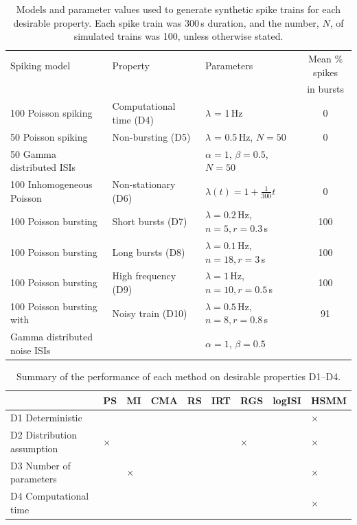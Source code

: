 \documentclass[12pt, titlepage]{article}
\begin{document}
			\begin{table}[h] \centering \small{
					\begin{tabular}{|l|l|l|c|}
						\hline
						Spiking model & Property & Parameters & Mean \% spikes 
						\\ & & & in bursts
						\\ \hline  \rowcolor{Gray} 100 Poisson spiking &  Computational time (D4) & $\lambda$ = 1$\,$Hz & 0 
						\\  50 Poisson spiking &  Non-bursting (D5) &  $\lambda$ = 0.5$\,$Hz, $N=50$ & 0 
						\\  50 Gamma distributed ISIs & & $\alpha=1$, $\beta = 0.5$, $N=50$ & 
						\\  \rowcolor{Gray}  100 Inhomogeneous Poisson &  Non-stationary (D6) & $\lambda(t) = 1+\frac{1}{300}t$ & 0 
						\\ 100 Poisson bursting &  Short bursts (D7) & $\lambda = 0.2\,$Hz, $n=5, r=0.3\,$s &  100
						\\  \rowcolor{Gray}   100 Poisson bursting & Long bursts (D8) &  $\lambda = 0.1\,$Hz, $n=18, r=3\,$s & 100 
						\\    100 Poisson bursting &  High frequency (D9) & $\lambda = 1\,$Hz, $n=10, r=0.5\,$s & 100
						\\  \rowcolor{Gray}  100 Poisson bursting with &  Noisy train (D10) & $\lambda = 0.5\,$Hz, $n=8, r=0.8\,$s & 91 
						\\  \rowcolor{Gray}  Gamma distributed noise ISIs& & $\alpha=1$, $\beta = 0.5$  & 
						\\ \hline
					\end{tabular}}
					\caption{Models and parameter values used to generate synthetic spike trains for each desirable property. Each spike train was 300$\,$s duration, and the number, $N$, of simulated trains was 100, unless otherwise stated.} \label{sim_params}
				\end{table}
				\begin{table} \centering  \begin{tabular}{|l|llllllll|}
						\hline
						& PS & MI & CMA & RS & IRT & RGS & logISI & HSMM
						\\ \hline
						\rowcolor{Gray} D1 Deterministic & \checkmark & \checkmark & \checkmark & \checkmark & \checkmark & \checkmark & \checkmark & $\times$
						\\ D2  Distribution assumption&  $\times$ & \checkmark & \checkmark & \checkmark & \checkmark & $\times$ & \checkmark & $\times$
						\\ \rowcolor{Gray} D3  Number of parameters&  \checkmark & $\times$ & \checkmark & \checkmark & \checkmark & \checkmark & \checkmark & $\times$
						\\D4  Computational time & \checkmark & \checkmark & \checkmark & \checkmark & \checkmark & \checkmark & \checkmark & $\times$
						\\ \hline
					\end{tabular}
					\caption{Summary of the performance of each method on desirable properties D1--D4.} \label{des_results1}
				\end{table}
\end{document}
